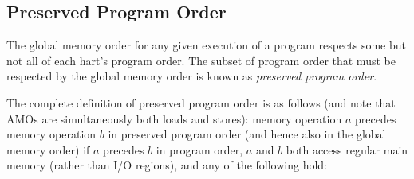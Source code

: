 \subsection*{Preserved Program Order}
The global memory order for any given execution of a program respects some but not all of each hart's program order.
The subset of program order that must be respected by the global memory order is known as {\em preserved program order}.

\newcommand{\ppost}{$b$ is a store, and $a$ and $b$ access overlapping memory addresses}
\newcommand{\ppofence}{There is a FENCE instruction that orders $a$ before $b$}
\newcommand{\ppoacquire}{$a$ has an acquire annotation}
\newcommand{\pporelease}{$b$ has a release annotation}
\newcommand{\pporcsc}{$a$ and $b$ both have RCsc annotations}
\newcommand{\ppoamoforward}{$a$ is generated by an AMO or SC instruction, $b$ is a load, and $b$ returns a value written by $a$}
\newcommand{\ppoaddr}{$b$ has a syntactic address dependency on $a$}
\newcommand{\ppodata}{$b$ has a syntactic data dependency on $a$}
\newcommand{\ppoctrl}{$b$ is a store, and $b$ has a syntactic control dependency on $a$}
\newcommand{\ppopair}{$a$ is paired with $b$}
\newcommand{\ppordw}{$a$ and $b$ are loads, $x$ is a byte read by both $a$ and $b$, there is no store to $x$ between $a$ and $b$ in program order, and $a$ and $b$ return values for $x$ written by different memory operations}
\newcommand{\ppoaddrdatarfi}{$b$ is a load, and there exists some store $m$ between $a$ and $b$ in program order such that $m$ has an address or data dependency on $a$, and $b$ returns a value written by $m$}
\newcommand{\ppoaddrpo}{$b$ is a store, and there exists some instruction $m$ between $a$ and $b$ in program order such that $m$ has an address dependency on $a$}

The complete definition of preserved program order is as follows (and note that AMOs are simultaneously both loads and stores):
memory operation $a$ precedes memory operation $b$ in preserved program order (and hence also in the global memory order) if $a$ precedes $b$ in program order, $a$ and $b$ both access regular main memory (rather than I/O regions), and any of the following hold:


